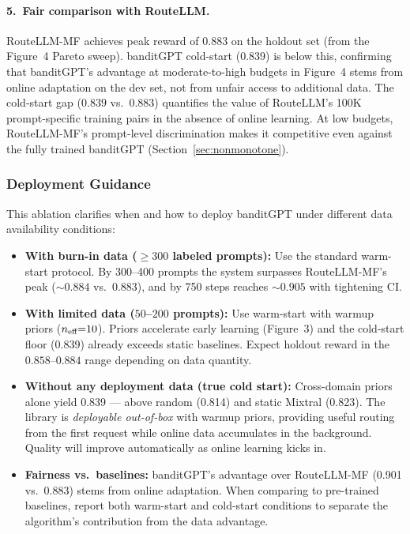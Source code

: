 \paragraph{5.\ Fair comparison with RouteLLM.}
RouteLLM-MF achieves peak reward of 0.883 on the holdout set (from the
Figure~4 Pareto sweep).  banditGPT cold-start (0.839) is below this,
confirming that banditGPT's advantage at moderate-to-high budgets
in Figure~4 stems from online adaptation on the dev set, not from unfair
access to additional data.  The cold-start gap ($0.839$ vs.\ $0.883$)
quantifies the value of RouteLLM's 100K prompt-specific training pairs
in the absence of online learning.  At low budgets, RouteLLM-MF's
prompt-level discrimination makes it competitive even against the fully
trained banditGPT (Section~\ref{sec:nonmonotone}).

\subsubsection{Deployment Guidance}

This ablation clarifies when and how to deploy banditGPT under different
data availability conditions:

\begin{itemize}[leftmargin=*,noitemsep]
    \item \textbf{With burn-in data ($\geq 300$ labeled prompts):}
          Use the standard warm-start protocol.  By 300--400 prompts the
          system surpasses RouteLLM-MF's peak (${\sim}0.884$ vs.\ 0.883),
          and by 750 steps reaches ${\sim}0.905$ with tightening CI.
    \item \textbf{With limited data ($50$--$200$ prompts):}
          Use warm-start with warmup priors ($n_{\text{eff}}{=}10$).  Priors
          accelerate early learning (Figure~3) and the cold-start floor
          (0.839) already exceeds static baselines.  Expect holdout
          reward in the $0.858$--$0.884$ range depending on data quantity.
    \item \textbf{Without any deployment data (true cold start):}
          Cross-domain priors alone yield 0.839 --- above random (0.814)
          and static Mixtral (0.823).  The library is \emph{deployable
          out-of-box} with warmup priors, providing useful routing from
          the first request while online data accumulates in the
          background.  Quality will improve automatically as online
          learning kicks in.
    \item \textbf{Fairness vs.\ baselines:}
          banditGPT's advantage over RouteLLM-MF (0.901 vs.\ 0.883) stems
          from online adaptation.  When comparing to pre-trained baselines,
          report both warm-start and cold-start conditions to separate
          the algorithm's contribution from the data advantage.
\end{itemize}

